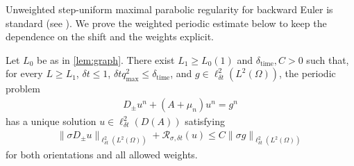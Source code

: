 \documentclass[print,wide,eng]{draft}
\begin{document}
Unweighted step-uniform maximal parabolic regularity for backward Euler is standard (see \cite[Theorem~3.1]{KLL}). We prove the weighted periodic estimate below to keep the dependence on the shift and the weights explicit.
%
\begin{lemma}\label{lem:eulerMR}
Let $L_0$ be as in \cref{lem:graph}. There exist $L_1\geq L_0(1)$ and $\delta_{\mathrm{time}},C>0$ such that, for every $L\geq L_1$, ${\delta t}\leq1$, ${\delta t}q_{\max}^2\leq\delta_{\mathrm{time}}$, and $g\in\ell_{\delta t}^2(L^2(\Omega))$, the periodic problem
%
\begin{align}\label{eq:spacecontinuousEuler}
D_\pm u^n+(A+\mu_n)u^n=g^n
\end{align}
%
has a unique solution $u\in\ell_{\delta t}^2(D(A))$ satisfying
%
\begin{align}\label{eq:eulerMR}
\|\sigma D_\pm u\|_{\ell_{\delta t}^2(L^2(\Omega))}+\mathcal{R}_{\sigma,{\delta t}}(u)
\le C\|\sigma g\|_{\ell_{\delta t}^2(L^2(\Omega))}
\end{align}
%
for both orientations and all allowed weights.
\end{lemma}
%
\end{document}
